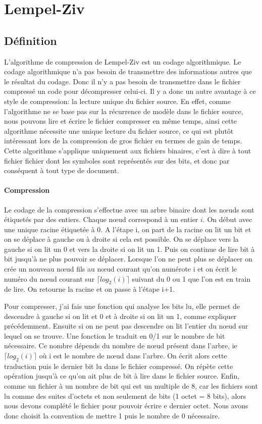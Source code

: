 \documentclass{report}
\begin{document}
\chapter*{Lempel-Ziv}
\section*{Définition }

L'algorithme de compression de Lempel-Ziv est un codage algorithmique.  Le codage algorithmique n’a pas besoin de transmettre des informations autres que le résultat du codage. Donc il n'y a pas besoin de transmettre dans le fichier compressé un code pour décompresser celui-ci. Il y a donc un autre avantage à ce style de compression: la lecture unique du fichier source. En effet, comme l'algorithme ne se base pas sur la récurrence de modèle dans le fichier source, nous pouvons lire et écrire le fichier compresser en même temps, ainsi cette algorithme nécessite une unique lecture du fichier source, ce qui est plutôt intéressant lors de la compression de gros fichier en termes de gain de temps. 
Cette algorithme s'applique uniquement aux fichiers binaires, c'est à dire à tout fichier fichier dont les symboles sont représentés sur des bits, et donc par conséquent à tout type de document. 

\subsubsection{Compression}
Le codage de la compression s'effectue avec un arbre binaire dont les nœuds sont étiquetés par des entiers. Chaque nœud correspond à un entier $i$. On début avec une unique racine étiquetée à 0.
A l'étape i, on part de la racine on lit un bit et on se déplace à gauche ou à droite si cela est possible. On se déplace vers la gauche si on lit un 0 et vers la droite si on lit un 1. Puis on continue de lire bit à bit jusqu'à ne plus pouvoir se déplacer. Lorsque l'on ne peut plus se déplacer on crée un nouveau nœud fils au nœud courant qu'on numérote i et on écrit le numéro du nœud courant sur $\lceil log_{2}(i) \rceil$ suivant du 0 ou 1 que l'on est en train de lire.
On retourne la racine et on passe à l'étape i+1.

Pour compresser, j'ai fais une fonction qui analyse les bits lu, elle permet de descendre à gauche si on lit et 0 et à droite si on lit un 1, comme expliquer précédemment. Ensuite si on ne peut pas descendre on lit l'entier du nœud sur lequel on se trouve. Une fonction le traduit en 0/1 sur le nombre de bit nécessaire. Ce nombre dépends du nombre de nœud présent dans l'arbre, ie $\lceil log_{2}(i) \rceil$ où i est le nombre de nœud dans l'arbre. 
On écrit alors cette traduction puis le dernier bit lu dans le fichier compressé. On répète cette opération jusqu'à ce qu'on ait plus de bit  à lire dans le fichier source.
Enfin, comme un fichier à un nombre de bit qui est un multiple de 8, car les fichiers sont lu comme des suites d'octets et non seulement de bits (1 octet = 8 bits),  alors nous devons complété le fichier pour pouvoir écrire e dernier octet.
Nous avons donc choisit la convention de mettre 1 puis le nombre de 0 nécessaire. 
\end{document}
